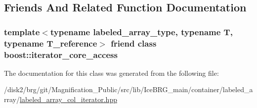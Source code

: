 \subsection{Friends And Related Function Documentation}
\hypertarget{classIceBRG_1_1labeled__array__col__iterator_ac09f73e325921cc50ebcd96bed0f8096}{}
\subsubsection[{boost\+::iterator\+\_\+core\+\_\+access}]{\setlength{\rightskip}{0pt plus 5cm}template$<$typename labeled\+\_\+array\+\_\+type, typename T, typename T\+\_\+reference$>$ friend class boost\+::iterator\+\_\+core\+\_\+access\hspace{0.3cm}{\ttfamily [friend]}}\label{classIceBRG_1_1labeled__array__col__iterator_ac09f73e325921cc50ebcd96bed0f8096}


The documentation for this class was generated from the following file\+:\begin{DoxyCompactItemize}
\item 
/disk2/brg/git/\+Magnification\+\_\+\+Public/src/lib/\+Ice\+B\+R\+G\+\_\+main/container/labeled\+\_\+array/\hyperlink{labeled__array__col__iterator_8hpp}{labeled\+\_\+array\+\_\+col\+\_\+iterator.\+hpp}\end{DoxyCompactItemize}
